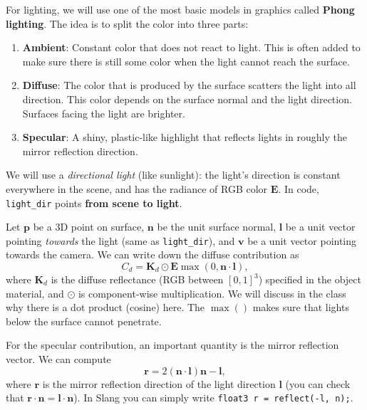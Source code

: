 For lighting, we will use one of the most basic models in graphics called \textbf{Phong lighting}. The idea is to split the color into three parts:
\begin{enumerate}
    \item \textbf{Ambient}: Constant color that does not react to light. This is often added to make sure there is still some color when the light cannot reach the surface.
    \item \textbf{Diffuse}: The color that is produced by the surface scatters the light into all direction. This color depends on the surface normal and the light direction. Surfaces facing the light are brighter.
    \item \textbf{Specular}: A shiny, plastic-like highlight that reflects lights in roughly the mirror reflection direction.
\end{enumerate}

We will use a \emph{directional light} (like sunlight): the light's direction is constant everywhere in the scene, and has the radiance of RGB color $\mathbf{E}$. In code, \lstinline{light_dir} points \textbf{from scene to light}.

Let $\mathbf{p}$ be a 3D point on surface, $\mathbf{n}$ be the unit surface normal, $\mathbf{l}$ be a unit vector pointing \emph{towards} the light (same as \lstinline{light_dir}), and $\mathbf{v}$ be a unit vector pointing towards the camera. We can write down the diffuse contribution as
\begin{equation}
    C_{d} = \mathbf{K}_d \odot \mathbf{E} \max\left(0, \mathbf{n} \cdot \mathbf{l} \right),
\end{equation}
where $\mathbf{K}_d$ is the diffuse reflectance (RGB between $[0, 1]^3$) specified in the object material, and $\odot$ is component-wise multiplication.
We will discuss in the class why there is a dot product (cosine) here. The $\max()$ makes sure that lights below the surface cannot penetrate.

For the specular contribution, an important quantity is the mirror reflection vector. We can compute
\begin{equation}
    \mathbf{r} = 2 (\mathbf{n} \cdot \mathbf{l}) \mathbf{n} - \mathbf{l},
\end{equation}
where $\mathbf{r}$ is the mirror reflection direction of the light direction $\mathbf{l}$ (you can check that $\mathbf{r} \cdot \mathbf{n} = \mathbf{l} \cdot \mathbf{n}$). In Slang you can simply write \lstinline{float3 r = reflect(-l, n);}.

